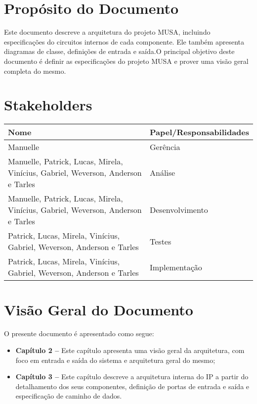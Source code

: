   \section{Propósito do Documento}
  Este documento descreve a arquitetura do projeto MUSA, incluindo especificações do circuitos internos de cada componente. Ele também apresenta diagramas de classe, definições de entrada e saída.O principal objetivo deste documento é definir as especificações do projeto MUSA e prover uma visão geral completa do mesmo.

  \section{Stakeholders}
    \FloatBarrier
    \begin{table}[H] 
      \begin{center}
        \begin{tabular}[pos]{|m{6cm} | m{8cm}|} 
          \hline 
          \cellcolor[gray]{0.9}\textbf{Nome} & \cellcolor[gray]{0.9}\textbf{Papel/Responsabilidades} \\  
           \hline Manuelle 	& Gerência \\
           \hline Manuelle, Patrick, Lucas, Mirela, Vinícius, Gabriel, Weverson, Anderson e Tarles 	& Análise \\
           \hline Manuelle, Patrick, Lucas, Mirela, Vinícius, Gabriel, Weverson, Anderson e Tarles 	& Desenvolvimento \\
           \hline Patrick, Lucas, Mirela, Vinícius, Gabriel, Weverson, Anderson e Tarles	& Testes       \\
           \hline Patrick, Lucas, Mirela, Vinícius, Gabriel, Weverson, Anderson e Tarles 	& Implementação \\ \hline
        \end{tabular}
      \end{center}
    \end{table} 

\section{Visão Geral do Documento}

O presente documento é apresentado como segue:

  \begin{itemize}
   \item \textbf{Capítulo 2 --} Este capítulo apresenta uma visão geral da arquitetura, com foco em entrada e saída do sistema e arquitetura geral do mesmo;
   \item \textbf{Capítulo 3 --} Este capítulo descreve a arquitetura interna do IP a partir do detalhamento dos seus componentes, definição de portas de entrada e saída e especificação de caminho de dados.
  \end{itemize}

